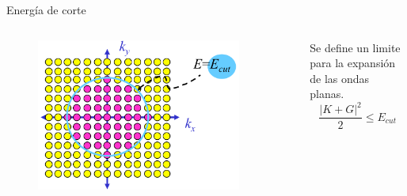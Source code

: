 \begin{frame}{Energ\'ia de corte}
\begin{columns}[t]
    \begin{figure}[H]
        \centering
        \includegraphics[width=0.9\textwidth]{contenido/teoria/img_teoria/EnergiaCorte.png}
    \end{figure}
    Se define un limite para la expansi\'on de las ondas planas.
   \[
   \frac{|K+G|^{2}}{2} \le E_{cut}
   \]
\end{columns}    
\end{frame}